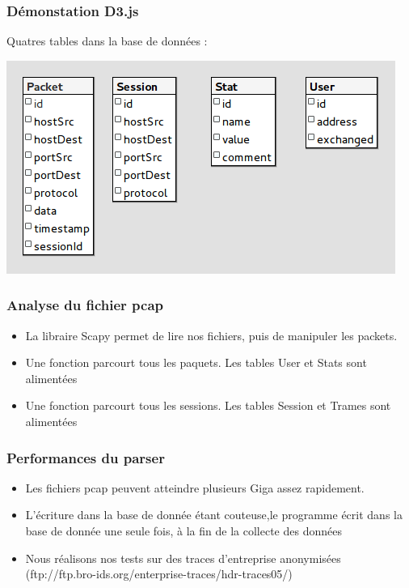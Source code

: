 \documentclass{beamer}
\begin{document}
  \begin{frame}
  \frametitle{Démonstation D3.js}
  \end{frame}

  \begin{frame}
   Quatres tables dans la base de données :
   \begin{center}
    \includegraphics[scale=0.6]{postgre.png}
   \end{center}
  \end{frame}
  
  \begin{frame}
    \frametitle{Analyse du fichier pcap}
    \begin{itemize}
     \item La libraire Scapy permet de lire nos fichiers, puis de manipuler les packets.
     \item Une fonction parcourt tous les paquets. Les tables User et Stats sont alimentées 
     \item Une fonction parcourt tous les sessions. Les tables Session et Trames sont alimentées
    \end{itemize}
  \end{frame}
  
  \begin{frame}
    \frametitle{Performances du parser}
    \begin{itemize}
     \item Les fichiers pcap peuvent atteindre plusieurs Giga assez rapidement. 
     \item L'écriture dans la base de donnée étant couteuse,le programme écrit dans la base de donnée une seule fois, à la fin de la collecte des données
     \item Nous réalisons nos tests sur des traces d'entreprise anonymisées
     (ftp://ftp.bro-ids.org/enterprise-traces/hdr-traces05/)
    \end{itemize}
  \end{frame}
  
\end{document}
